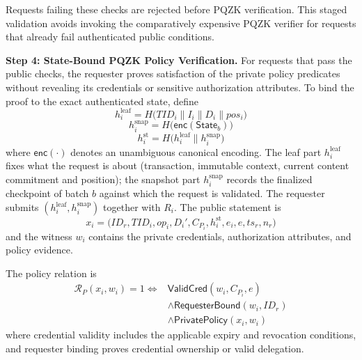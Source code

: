 \documentclass[lettersize,journal]{IEEEtran}
\begin{document}
Requests failing these checks are rejected before PQZK verification.
This staged validation avoids invoking the comparatively expensive
PQZK verifier for requests that already fail authenticated public
conditions.

\medskip
\noindent\textbf{Step 4: State-Bound PQZK Policy Verification.}
For requests that pass the public checks, the requester proves
satisfaction of the private policy predicates without revealing its
credentials or sensitive authorization attributes. To bind the proof
to the exact authenticated state, define
\begin{equation}
h_i^{\mathrm{leaf}} = H\big(TID_i\parallel I_i\parallel D_i\parallel pos_i\big)
\end{equation}
\begin{equation}
h_i^{\mathrm{snap}} = H\big(\mathsf{enc}(\mathsf{State}_b)\big)
\end{equation}
\begin{equation}
h_i^{\mathrm{st}}
=
H\big(h_i^{\mathrm{leaf}}\parallel h_i^{\mathrm{snap}}\big)
\label{eq:hleaf_hsnap}
\end{equation}
where $\mathsf{enc}(\cdot)$ denotes an unambiguous canonical encoding.
The leaf part $h_i^{\mathrm{leaf}}$ fixes what the request
is about (transaction, immutable context, current content commitment and
position); the snapshot part $h_i^{\mathrm{snap}}$ records the finalized
checkpoint of batch $b$ against which the request is validated. The
requester submits $(h_i^{\mathrm{leaf}},h_i^{\mathrm{snap}})$ together
with $R_i$.
The public statement is
\begin{equation}
x_i=\big(ID_r,TID_i,op_i,D_i',
C_{P_i},h_i^{\mathrm{st}},e_i,e,ts_r,n_r\big)
\label{eq:pqzk_stmt}
\end{equation}
and the witness $w_i$ contains the private credentials,
authorization attributes, and policy evidence.

The policy relation is
\begin{equation}
\begin{aligned}
\mathcal{R}_{P}(x_i,w_i)=1
\iff{}&
\mathsf{ValidCred}(w_i,C_{P_i},e)\\
&\land
\mathsf{RequesterBound}(w_i,ID_r)\\
&\land
\mathsf{PrivatePolicy}(x_i,w_i)
\end{aligned}
\end{equation}
where credential validity includes the applicable expiry and revocation
conditions, and requester binding proves credential ownership or valid
delegation.
\end{document}
